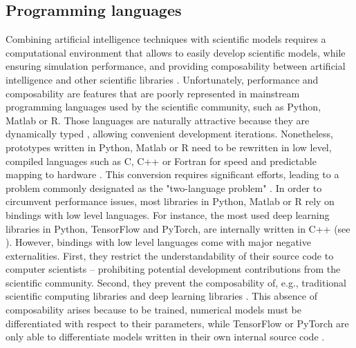 


\subsection{Programming languages}
\label{subsec:Julia}
Combining artificial intelligence techniques with scientific models requires a computational environment that allows to easily develop scientific models, while ensuring simulation performance, and providing composability between artificial intelligence and other scientific libraries \citep{Rackauckas2020}. Unfortunately, performance and composability are features that are poorly represented in mainstream programming languages used by the scientific community, such as Python, Matlab or R.
% 
Those languages are naturally attractive because they are dynamically typed \citep{Bezanson2017}, allowing convenient development iterations. Nonetheless, prototypes written in Python, Matlab or R need to be rewritten in low level, compiled languages such as C, C++ or Fortran for speed and predictable mapping to hardware \citep{Perkel2019,Bezanson2017}. This conversion requires significant efforts, leading to a problem commonly designated as the "two-language problem" \citep{Bezanson2017}.
% 
In order to circumvent performance issues, most libraries in Python, Matlab or R rely on bindings with low level languages. For instance, the most used deep learning libraries in Python, TensorFlow and PyTorch, are internally written in C++ (see \cite{tensorflow,pytorch}). However, bindings with low level languages come with major negative externalities. First, they restrict the understandability of their source code to computer scientists -- prohibiting potential development contributions from the scientific community. Second, they prevent the composability of, e.g., traditional scientific computing libraries and deep learning libraries \citep{Innes2019}. This absence of composability arises because to be trained, numerical models must be differentiated with respect to their parameters, while TensorFlow or PyTorch are only able to differentiate models written in their own internal source code \citep{Innes2019}.

